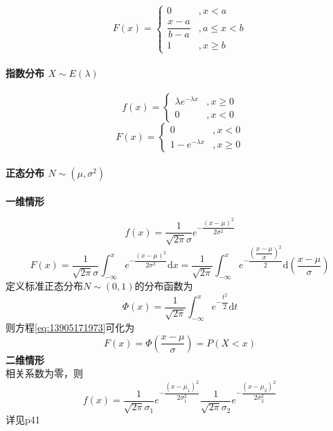 \begin{equation*}
  F(x)=\left\{
    \begin{array}{cl}
        0&,x < a \\
        \dfrac{x-a}{b-a}&, a \leq x < b \\
        1&, x \geq b
    \end{array}\right.
\end{equation*}

\paragraph{指数分布 $X \sim E(\lambda)$}
\begin{equation*}
    f(x)=\left\{
    \begin{array}{cl}
      \lambda e^{-\lambda x} &, x \geq 0 \\
      0 &, x < 0
    \end{array}
    \right.
\end{equation*}
\begin{equation*}
  F(x)=\left\{
    \begin{array}{cl}
        0&,x < 0 \\
        1-e^{-\lambda x}&, x\geq 0
    \end{array}\right.
\end{equation*}

\paragraph{正态分布 $N\sim (\mu,\sigma^2 )$}
\textbf{一维情形}

\begin{equation*}
  f(x)=\dfrac{1}{\sqrt{2\pi}\sigma}e^{-\dfrac{(x-\mu)^{2}}{2\sigma^{2}}}
\end{equation*}
\begin{equation}
  \label{eq:13905171973}
  F(x)=\dfrac{1}{\sqrt{2\pi}\sigma}\int_{-\infty}^{x} e^{-\dfrac{(x-\mu)^{2}}{2\sigma^{2}}} \mathrm{d}x = \dfrac{1}{\sqrt{2\pi}}\int_{-\infty}^{x} e^{-\dfrac{\left(\dfrac{x-\mu}{\sigma}\right)^{2}}{2}} \mathrm{d}\left( \dfrac{x-\mu}{\sigma} \right)
\end{equation}
定义标准正态分布$N\sim (0,1)$的分布函数为
\begin{equation*}
  \Phi(x)=\dfrac{1}{\sqrt{2\pi}} \int_{-\infty}^{x}e^{-\dfrac{t^{2}}{2}} \mathrm{d} t
\end{equation*}
则方程\ref{eq:13905171973}可化为
\begin{equation*}
  F(x)=\Phi \left( \dfrac{x-\mu}{\sigma} \right) = P(X<x)
\end{equation*}
\textbf{二维情形}\\
相关系数为零，则
\begin{equation*}
  f(x)=\dfrac{1}{\sqrt{2\pi}\sigma_{1}}e^{-\dfrac{(x-\mu_{1})^{2}}{2\sigma_{1}^{2}}} \dfrac{1}{\sqrt{2\pi}\sigma_{2}}e^{-\dfrac{(x-\mu_{2})^{2}}{2\sigma_{2}^{2}}}
\end{equation*}
详见p41


